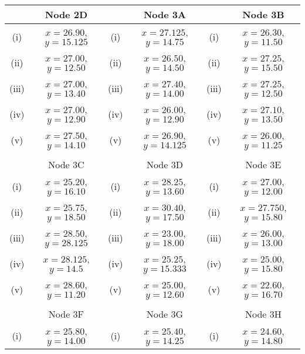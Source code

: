 \documentclass[12pt]{article}
\begin{document}
								\begin{tabular}{||c|c||c|c||c|c||}
								
					
					\hline  & Node 2D &   & Node 3A &  & Node 3B   \\  \hline
					\hline (i) & $x= 26.90$, $y= 15.125$ &  (i) & $x= 27.125$, $y= 14.75$  & (i)  & $x= 26.30$, $y= 11.50$\\  \hline
					\hline (ii)  & $x= 27.00$, $y= 12.50$  &  (ii) & $x= 26.50$, $y= 14.50$ & (ii) & $x= 27.25$, $y = 15.50$ \\  \hline
					\hline (iii) & $x= 27.00$, $y = 13.40$  & (iii) & $x= 27.40$, $y =14.00 $ &(iii) & $x= 27.25$, $y= 12.50$ \\  \hline
					\hline (iv)  & $x= 27.00$, $y= 12.90$  & (iv) & $x= 26.00$, $y = 12.90$ & (iv)  & $x= 27.10$, $y= 13.50$\\  \hline
					\hline (v) & $x= 27.50$, $y= 14.10$ & (v) & $x= 26.90$, $y= 14.125 $  &(v) & $x= 26.00$, $y= 11.25$\\  \hline & & & & & \\
					\hline
					\hline  & Node 3C &   & Node 3D &  & Node 3E  \\  \hline
					\hline (i) & $x= 25.20$, $y = 16.10$ &  (i) & $x= 28.25$, $y = 13.60$  & (i)  & $x= 27.00$, $y = 12.00$\\  \hline
					\hline (ii) & $x= 25.75$, $y= 18.50$  & (ii) & $x= 30.40$, $y =17.50 $ &(ii) & $x= 27.750$, $y = 15.80$ \\  \hline
					\hline (iii)  & $x= 28.50$, $y= 28.125$  & (iii) & $x= 23.00$, $y = 18.00$ & (iii)  & $x= 26.00$, $y = 13.00$\\  \hline
					\hline (iv)  & $x= 28.125$, $y= 14.5$  &  (iv) & $x= 25.25$, $y = 15.333$ & (iv) & $x= 25.00$, $y = 15.80$ \\  \hline
					\hline (v) & $x= 28.60$, $y= 11.20$ & (v) & $x= 25.00 $, $y = 12.60$  &(v) & $x= 22.60$, $y = 16.70$\\  \hline & & & & & \\
					\hline
					\hline  &  Node 3F &  & Node 3G &   & Node 3H \\  \hline
					\hline (i) & $x= 25.80$, $y= 14.00$ & (i) & $x= 25.40$, $y = 14.25$  & (i)  & $x= 24.60$, $y= 14.80$\\  \hline

\end{tabular}
\end{document}
